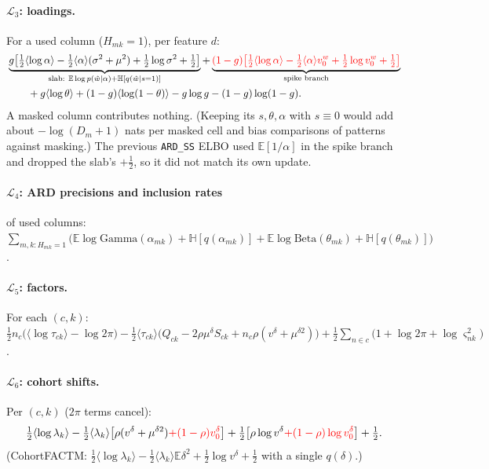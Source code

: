 \documentclass[11pt,a4paper]{article}
\newcommand{\new}[1]{{\color{red}#1}}
\newcommand{\E}{\mathbb{E}}
\newcommand{\Betad}{\mathrm{Beta}}
\newcommand{\Gam}{\mathrm{Gamma}}
\newcommand{\ELBO}{\mathcal{L}}
\newcommand{\wh}{\hat w}
\theoremstyle{definition}
\theoremstyle{remark}
\begin{document}
\paragraph{$\ELBO_3$: loadings.} For a used column ($H_{mk}=1$), per feature $d$:
\begin{align*}
&\underbrace{g\big[\tfrac12\langle\log\alpha\rangle-\tfrac12\langle\alpha\rangle(\sigma^2+\mu^2)+\tfrac12\log\sigma^2+\tfrac12\big]}_{\text{slab: }\E\log p(\wh\mid\alpha)+\mathbb H[q(\wh\mid s=1)]}
+\underbrace{\new{(1-g)\big[\tfrac12\langle\log\alpha\rangle-\tfrac12\langle\alpha\rangle v_0^w+\tfrac12\log v_0^w+\tfrac12\big]}}_{\text{spike branch}}\\
&\qquad+g\langle\log\theta\rangle+(1-g)\langle\log(1-\theta)\rangle-g\log g-(1-g)\log(1-g).
\end{align*}
\new{A masked column contributes nothing.} (Keeping its $s,\theta,\alpha$ with $s\equiv0$ would add about $-\log(D_m+1)$
nats per masked cell and bias comparisons of patterns against masking.) The previous \texttt{ARD\_SS} ELBO used
$\E[1/\alpha]$ in the spike branch and dropped the slab's $+\tfrac12$, so it did not match its own update.

\paragraph{$\ELBO_4$: ARD precisions and inclusion rates} of used columns:
$\sum_{m,k:H_{mk}=1}\big(\E\log\Gam(\alpha_{mk})+\mathbb H[q(\alpha_{mk})]+\E\log\Betad(\theta_{mk})+\mathbb H[q(\theta_{mk})]\big)$.

\paragraph{$\ELBO_5$: factors.} For each $(c,k)$:
$\tfrac12n_c\big(\langle\log\tau_{ck}\rangle-\log2\pi\big)-\tfrac12\langle\tau_{ck}\rangle\big(Q_{ck}-2\rho\mu^\delta S_{ck}+n_c\rho(v^\delta+\mu^{\delta2})\big)
+\tfrac12\sum_{n\in c}\big(1+\log2\pi+\log\varsigma^2_{nk}\big)$.

\paragraph{$\ELBO_6$: cohort shifts.} Per $(c,k)$ ($2\pi$ terms cancel):
\[
\tfrac12\langle\log\lambda_k\rangle-\tfrac12\langle\lambda_k\rangle\big[\rho(v^\delta+\mu^{\delta2})\new{+(1-\rho)v_0^\delta}\big]
+\tfrac12\big[\rho\log v^\delta\new{+(1-\rho)\log v^\delta_0}\big]+\tfrac12.
\]
(CohortFACTM: $\tfrac12\langle\log\lambda_k\rangle-\tfrac12\langle\lambda_k\rangle\E\delta^2+\tfrac12\log v^\delta+\tfrac12$ with a single $q(\delta)$.)
\end{document}
